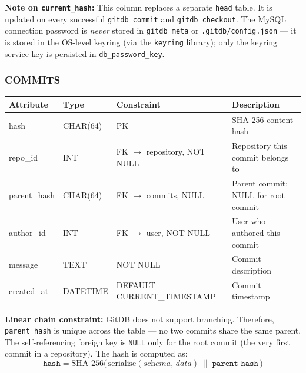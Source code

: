 \documentclass[12pt, a4paper]{article}
\begin{document}
\begin{tcolorbox}[infobox]
\textbf{Note on \texttt{current\_hash}:} This column replaces a separate
\texttt{head} table. It is updated on every successful \texttt{gitdb commit}
and \texttt{gitdb checkout}. The MySQL connection password is \emph{never} stored
in \texttt{gitdb\_meta} or \texttt{.gitdb/config.json} --- it is stored in the
OS-level keyring (via the \texttt{keyring} library); only the keyring service key
is persisted in \texttt{db\_password\_key}.
\end{tcolorbox}

\subsubsection{COMMITS}

\begin{center}
\renewcommand{\arraystretch}{1.3}
\begin{tabular}{>{\ttfamily}l >{\ttfamily}l l p{4.5cm}}
\toprule
\textbf{Attribute} & \textbf{Type} & \textbf{Constraint} & \textbf{Description} \\
\midrule
hash         & CHAR(64)  & PK                              & SHA-256 content hash \\
repo\_id     & INT       & FK $\to$ repository, NOT NULL   & Repository this commit belongs to \\
parent\_hash & CHAR(64)  & FK $\to$ commits, NULL          & Parent commit; NULL for root commit \\
author\_id   & INT       & FK $\to$ user, NOT NULL         & User who authored this commit \\
message      & TEXT      & NOT NULL                        & Commit description \\
created\_at  & DATETIME  & DEFAULT CURRENT\_TIMESTAMP     & Commit timestamp \\
\bottomrule
\end{tabular}
\end{center}

\begin{tcolorbox}[warningbox]
\textbf{Linear chain constraint:} GitDB does not support branching. Therefore,
\texttt{parent\_hash} is unique across the table --- no two commits share the
same parent. The self-referencing foreign key is \texttt{NULL} only for the root
commit (the very first commit in a repository). The hash is computed as:
\[
\texttt{hash} = \text{SHA-256}\bigl(\,\text{serialise}(\textit{schema},\,
\textit{data}) \;\|\; \texttt{parent\_hash}\,\bigr)
\]
\end{tcolorbox}
\end{document}
